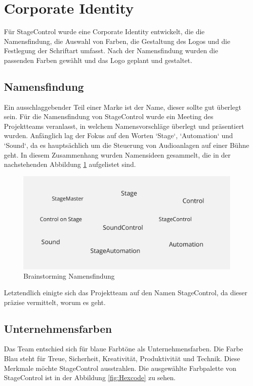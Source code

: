 \section{Corporate Identity}
Für StageControl wurde eine Corporate Identity entwickelt, die die Namensfindung, die Auswahl von Farben, die Gestaltung des Logos und die Festlegung der Schriftart umfasst. Nach der Namensfindung wurden die passenden Farben gewählt und das Logo geplant und gestaltet.

\subsection{Namensfindung}
Ein ausschlaggebender Teil einer Marke ist der Name, dieser sollte gut überlegt sein. Für die Namensfindung von StageControl wurde ein Meeting des Projektteams veranlasst, in welchem Namensvorschläge überlegt und präsentiert wurden. 
Anfänglich lag der Fokus auf den Worten ‘Stage‘, ‘Automation‘ und ‘Sound‘, da es hauptsächlich um die Steuerung von Audioanlagen auf einer Bühne geht. In diesem Zusammenhang wurden Namensideen gesammelt, die in der nachstehenden Abbildung \ref{fig:Brainstorming_Namensfindung} aufgelistet sind. 

\begin{figure}[H]
	\centering
	\includegraphics[width=0.5\linewidth]{images/Brainstorming_Namensfindung.png}
	\caption[Brainstorming Namensfindung]{Brainstorming Namensfindung}
	\label{fig:Brainstorming_Namensfindung}
\end{figure}

Letztendlich einigte sich das Projektteam auf den Namen StageControl, da dieser präzise vermittelt, worum es geht.

\newpage
\subsection{Unternehmensfarben}
Das Team entschied sich für blaue Farbtöne als Unternehmensfarben. Die Farbe Blau steht für Treue, Sicherheit, Kreativität, Produktivität und Technik. \parencite{BedeutungderFarbeBlau} Diese Merkmale möchte StageControl ausstrahlen. Die ausgewählte Farbpalette von StageControl ist in der Abbildung \ref{fig:Hexcode} zu sehen. 

